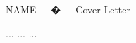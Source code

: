 \documentclass[11pt, a4paper]{awesome-cv}
\begin{document}
\makecvfooter
  {}
  {NAME~~~�~~~Cover Letter}
  {}

\makelettertitle

\begin{cvletter}

 ...
...
...
\end{cvletter}

\makeletterclosing
\end{document}
